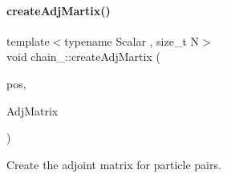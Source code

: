 \paragraph{\texorpdfstring{create\+Adj\+Martix()}{createAdjMartix()}}
{\footnotesize\ttfamily template$<$typename Scalar , size\+\_\+t N$>$ \\
void chain_\+::create\+Adj\+Martix (\begin{DoxyParamCaption}\item[{const \mbox{\hyperlink{namespacechain_aa715d2f046187ea9f0c3ea55605d6214}{Vector\+Array}}$<$ Scalar, N $>$ \&}]{pos,  }\item[{\mbox{\hyperlink{namespacechain_a3a021b84403e03113e1dcd61ba304963}{Node\+Array}}$<$ Scalar, N $\ast$(N -\/ 1)/2 $>$ \&}]{Adj\+Matrix }\end{DoxyParamCaption})}



Create the adjoint matrix for particle pairs. 

